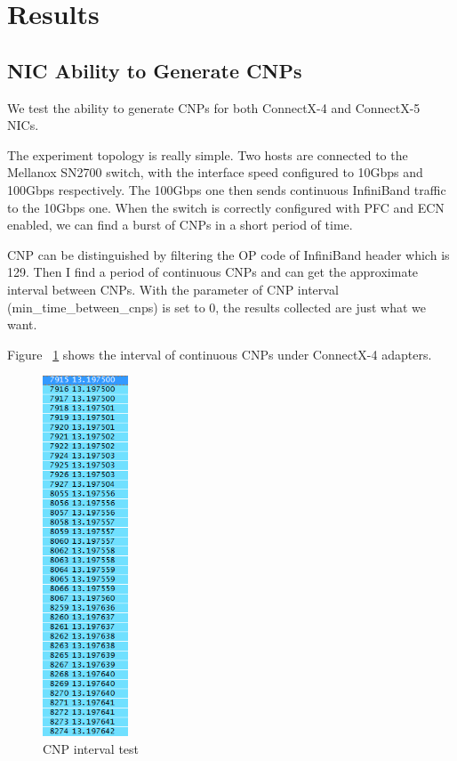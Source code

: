 \documentclass[12pt,a4paper]{article}
\begin{document}
\section{Results}

\subsection{NIC Ability to Generate CNPs}
We test the ability to generate CNPs for both ConnectX-4 and ConnectX-5 NICs.

The experiment topology is really simple.
Two hosts are connected to the Mellanox SN2700 switch, with the interface speed configured to 10Gbps and 100Gbps respectively.
The 100Gbps one then sends continuous InfiniBand traffic to the 10Gbps one.
When the switch is correctly configured with PFC and ECN enabled, we can find a burst of CNPs in a short period of time.

CNP can be distinguished by filtering the OP code of InfiniBand header which is 129.
Then I find a period of continuous CNPs and can get the approximate interval between CNPs.
With the parameter of CNP interval (min\_time\_between\_cnps) is set to 0, the results collected are just what we want.

Figure ~\ref{fig:CNPint} shows the interval of continuous CNPs under ConnectX-4 adapters.

\begin{figure}[ht]
	\begin{center}
		\includegraphics[width=1in]{CNPint}
		\caption{CNP interval test}
		\label{fig:CNPint}
	\end{center}
\end{figure}
\end{document}
